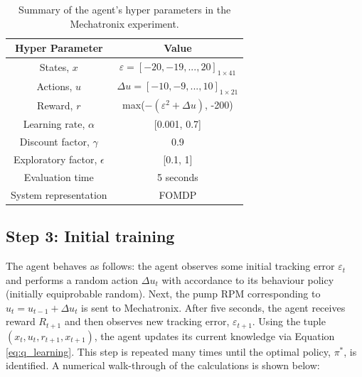 \begin{table}[H]
\caption{Summary of the agent's hyper parameters in the Mechatronix experiment.}
\label{tab:rl_system1_params}
\centering
\begin{tabular}{c|c}
\textbf{Hyper Parameter}     & Value  \\
\hline
States, $x$	             	& $\varepsilon = [-20, -19, ..., 20]_{1 \times 41} $		 \\
Actions, $u$               & $\Delta u = [-10, -9, ..., 10]_{1 \times 21}$		\\
Reward, $r$	               & max($-(\varepsilon^2 + \Delta u)$, -200)		\\
Learning rate, $\alpha$		& [0.001, 0.7]		 \\
Discount factor, $\gamma$      	& 0.9  \\
Exploratory factor, $\epsilon$             & [0.1, 1]  \\
Evaluation time                 & 5 seconds \\
System representation           & FOMDP \\
\end{tabular}
\end{table}

\subsection{Step 3: Initial training}
The agent behaves as follows: the agent observes some initial tracking error $\varepsilon_t$ and performs a random action $\Delta u_t$ with accordance to its behaviour policy (initially equiprobable random).  Next, the pump RPM corresponding to $u_t = u_{t-1} + \Delta u_t$ is sent to Mechatronix.  After five seconds, the agent receives reward $R_{t+1}$ and then observes new tracking error, $\varepsilon_{t+1}$. Using the tuple $(x_t, u_t, r_{t+1}, x_{t+1})$, the agent updates its current knowledge via Equation \ref{eq:q_learning}. This step is repeated many times until the optimal policy, $\pi^*$, is identified. A numerical walk-through of the calculations is shown below:

